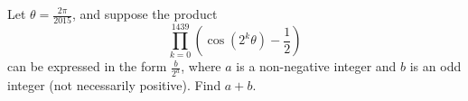 Let $\theta=\frac{2\pi}{2015}$, and suppose the product \[\prod_{k=0}^{1439}\left(\cos(2^k\theta)-\frac{1}{2}\right)\] can be expressed in the form $\frac{b}{2^a}$, where $a$ is a non-negative integer and $b$ is an odd integer (not necessarily positive). Find $a+b$.